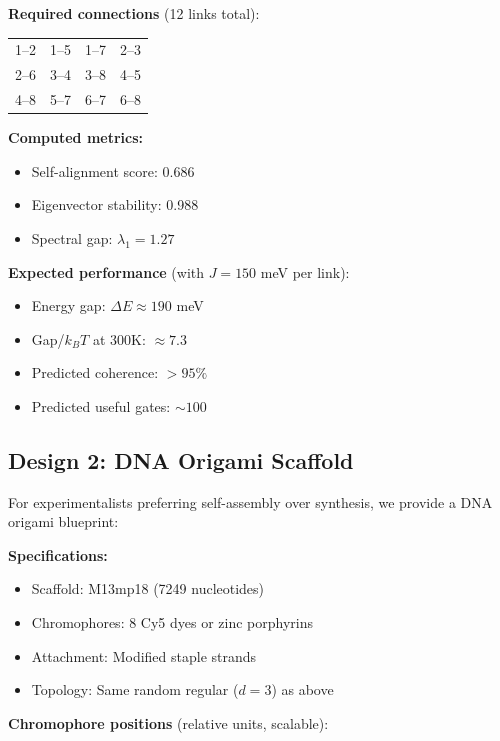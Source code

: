 \documentclass[11pt,a4paper]{article}
\theoremstyle{plain}
\theoremstyle{definition}
\theoremstyle{remark}
\begin{document}
\textbf{Required connections} (12 links total):
\begin{center}
\begin{tabular}{cccc}
1--2 & 1--5 & 1--7 & 2--3 \\
2--6 & 3--4 & 3--8 & 4--5 \\
4--8 & 5--7 & 6--7 & 6--8 \\
\end{tabular}
\end{center}

\textbf{Computed metrics:}
\begin{itemize}
    \item Self-alignment score: 0.686
    \item Eigenvector stability: 0.988
    \item Spectral gap: $\lambda_1 = 1.27$
\end{itemize}

\textbf{Expected performance} (with $J = 150$ meV per link):
\begin{itemize}
    \item Energy gap: $\Delta E \approx 190$ meV
    \item Gap/$k_B T$ at 300K: $\approx 7.3$
    \item Predicted coherence: $>95\%$
    \item Predicted useful gates: $\sim 100$
\end{itemize}

\subsection{Design 2: DNA Origami Scaffold}

For experimentalists preferring self-assembly over synthesis, we provide a DNA origami blueprint:

\textbf{Specifications:}
\begin{itemize}
    \item Scaffold: M13mp18 (7249 nucleotides)
    \item Chromophores: 8 Cy5 dyes or zinc porphyrins
    \item Attachment: Modified staple strands
    \item Topology: Same random regular ($d=3$) as above
\end{itemize}

\textbf{Chromophore positions} (relative units, scalable):
\end{document}
